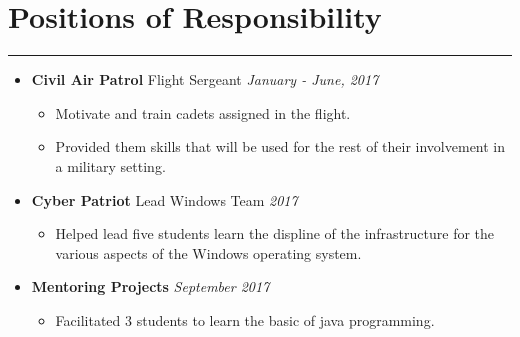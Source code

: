 \documentclass[a4paper]{article}
\begin{document}
\section*{Positions of Responsibility}
\hrule
\vspace{3mm}
\begin{itemize}
	\item
	      \textbf{Civil Air Patrol} Flight Sergeant
	      \hfill \textit{January - June, 2017}
	      \begin{itemize}
	      	\vspace{-2mm} \setlength\itemsep{-0.7mm}
		\item Motivate and train cadets assigned in the flight. 
		\item Provided them skills that will be used for the rest of their involvement in a military setting. 
	      \end{itemize}
	\item
	      \textbf{Cyber Patriot} Lead Windows Team
	      \hfill \textit{2017}
	      \begin{itemize}
	      	\vspace{-2mm} \setlength\itemsep{-0.7mm}
		\item Helped lead five students learn the displine of the infrastructure for the various aspects of the Windows operating system.
	      \end{itemize}
	\item
	      \textbf{Mentoring Projects}
		  \hfill \textit{September 2017}
	      \begin{itemize}
	      	\vspace{-2mm} \setlength\itemsep{-0.7mm}
	      	\item Facilitated 3 students to learn the basic of java programming.
	      \end{itemize}
\end{itemize}

\end{document}
